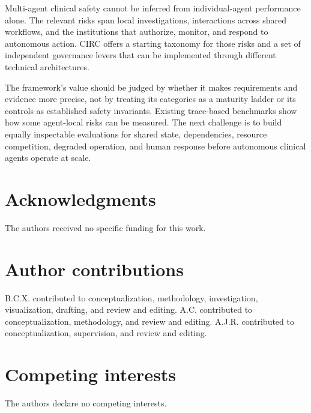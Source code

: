 \documentclass[10pt]{article}
\begin{document}
Multi-agent clinical safety cannot be inferred from individual-agent performance alone. The relevant
risks span local investigations, interactions across shared workflows, and the institutions that
authorize, monitor, and respond to autonomous action. CIRC offers a starting taxonomy for those risks
and a set of independent governance levers that can be implemented through different technical
architectures.

The framework's value should be judged by whether it makes requirements and evidence more precise,
not by treating its categories as a maturity ladder or its controls as established safety invariants.
Existing trace-based benchmarks show how some agent-local risks can be measured. The next challenge is
to build equally inspectable evaluations for shared state, dependencies, resource competition,
degraded operation, and human response before autonomous clinical agents operate at scale.

\section*{Acknowledgments}
The authors received no specific funding for this work.

\section*{Author contributions}
B.C.X. contributed to conceptualization, methodology, investigation, visualization, drafting, and
review and editing. A.C. contributed to conceptualization, methodology, and review and editing.
A.J.R. contributed to conceptualization, supervision, and review and editing.

\section*{Competing interests}
The authors declare no competing interests.



\end{document}
